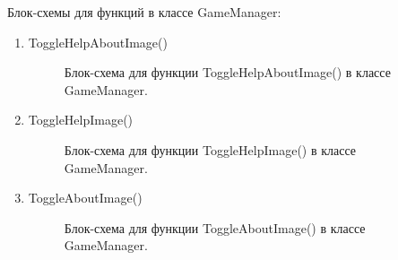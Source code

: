 \documentclass[14pt, oneside]{altsu-report}
\begin{document}
Блок-схемы для функций в классе GameManager:
\begin{enumerate}
\item ToggleHelpAboutImage()

\begin{figure}[H]
\caption{Блок-схема для функции ToggleHelpAboutImage() в классе GameManager.}
\end{figure}

\item ToggleHelpImage()

\begin{figure}[H]
\caption{Блок-схема для функции ToggleHelpImage() в классе GameManager.}
\end{figure}

\item ToggleAboutImage()

\begin{figure}[H]
\caption{Блок-схема для функции ToggleAboutImage() в классе GameManager.}
\end{figure}


\end{enumerate}
\end{document}
